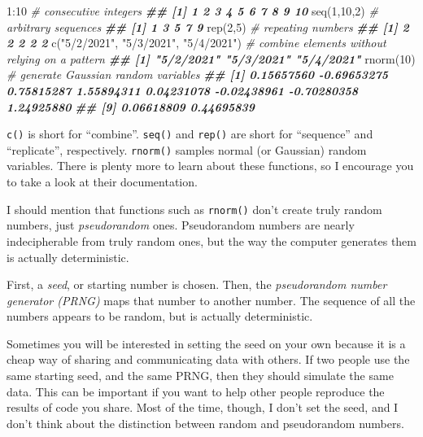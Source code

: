 \documentclass[
  12pt,
]{krantz}
\makeatletter
\newenvironment{Shaded}{\begin{snugshade}}{\end{snugshade}}
\newcommand{\CommentTok}[1]{\textcolor[rgb]{0.37,0.37,0.37}{\textit{#1}}}
\newcommand{\DecValTok}[1]{\textcolor[rgb]{0.06,0.06,0.06}{#1}}
\newcommand{\DocumentationTok}[1]{\textcolor[rgb]{0.37,0.37,0.37}{\textbf{\textit{#1}}}}
\newcommand{\FunctionTok}[1]{\textcolor[rgb]{0,0,0}{#1}}
\newcommand{\NormalTok}[1]{#1}
\newcommand{\SpecialCharTok}[1]{\textcolor[rgb]{0,0,0}{#1}}
\newcommand{\StringTok}[1]{\textcolor[rgb]{0.5,0.5,0.5}{#1}}
\newenvironment{kframe}{%
\medskip{}
\setlength{\fboxsep}{.8em}
 \def\at@end@of@kframe{}%
 \ifinner\ifhmode%
  \def\at@end@of@kframe{\end{minipage}}%
  \begin{minipage}{\columnwidth}%
 \fi\fi%
 \def\FrameCommand##1{\hskip\@totalleftmargin \hskip-\fboxsep
 \colorbox{shadecolor}{##1}\hskip-\fboxsep
     \hskip-\linewidth \hskip-\@totalleftmargin \hskip\columnwidth}%
 \MakeFramed {\advance\hsize-\width
   \@totalleftmargin\z@ \linewidth\hsize
   \@setminipage}}%
 {\par\unskip\endMakeFramed%
 \at@end@of@kframe}
\renewenvironment{Shaded}{\begin{kframe}}{\end{kframe}}
\makeatother
\begin{document}
\begin{Shaded}
\begin{Highlighting}[]
\DecValTok{1}\SpecialCharTok{:}\DecValTok{10}         \CommentTok{\# consecutive integers}
\DocumentationTok{\#\#  [1]  1  2  3  4  5  6  7  8  9 10}
\FunctionTok{seq}\NormalTok{(}\DecValTok{1}\NormalTok{,}\DecValTok{10}\NormalTok{,}\DecValTok{2}\NormalTok{)  }\CommentTok{\# arbitrary sequences}
\DocumentationTok{\#\# [1] 1 3 5 7 9}
\FunctionTok{rep}\NormalTok{(}\DecValTok{2}\NormalTok{,}\DecValTok{5}\NormalTok{)     }\CommentTok{\# repeating numbers}
\DocumentationTok{\#\# [1] 2 2 2 2 2}
\FunctionTok{c}\NormalTok{(}\StringTok{"5/2/2021"}\NormalTok{, }\StringTok{"5/3/2021"}\NormalTok{, }\StringTok{"5/4/2021"}\NormalTok{) }\CommentTok{\# combine elements without relying on a pattern}
\DocumentationTok{\#\# [1] "5/2/2021" "5/3/2021" "5/4/2021"}
\FunctionTok{rnorm}\NormalTok{(}\DecValTok{10}\NormalTok{)                             }\CommentTok{\# generate Gaussian random variables}
\DocumentationTok{\#\#  [1]  0.15657560 {-}0.69653275  0.75815287  1.55894311  0.04231078 {-}0.02438961 {-}0.70280358  1.24925880}
\DocumentationTok{\#\#  [9]  0.06618809  0.44695839}
\end{Highlighting}
\end{Shaded}

\texttt{c()} is short for ``combine''. \texttt{seq()} and \texttt{rep()} are short for ``sequence'' and ``replicate'', respectively. \texttt{rnorm()} samples normal (or Gaussian) random variables. There is plenty more to learn about these functions, so I encourage you to take a look at their documentation.

I should mention that functions such as \texttt{rnorm()} don't create truly random numbers, just \emph{pseudorandom} ones. Pseudorandom numbers are nearly indecipherable from truly random ones, but the way the computer generates them is actually deterministic.

First, a \emph{seed}, or starting number is chosen. Then, the \emph{pseudorandom number generator (PRNG)} maps that number to another number. The sequence of all the numbers appears to be random, but is actually deterministic.

Sometimes you will be interested in setting the seed on your own because it is a cheap way of sharing and communicating data with others. If two people use the same starting seed, and the same PRNG, then they should simulate the same data. This can be important if you want to help other people reproduce the results of code you share. Most of the time, though, I don't set the seed, and I don't think about the distinction between random and pseudorandom numbers.
\end{document}
